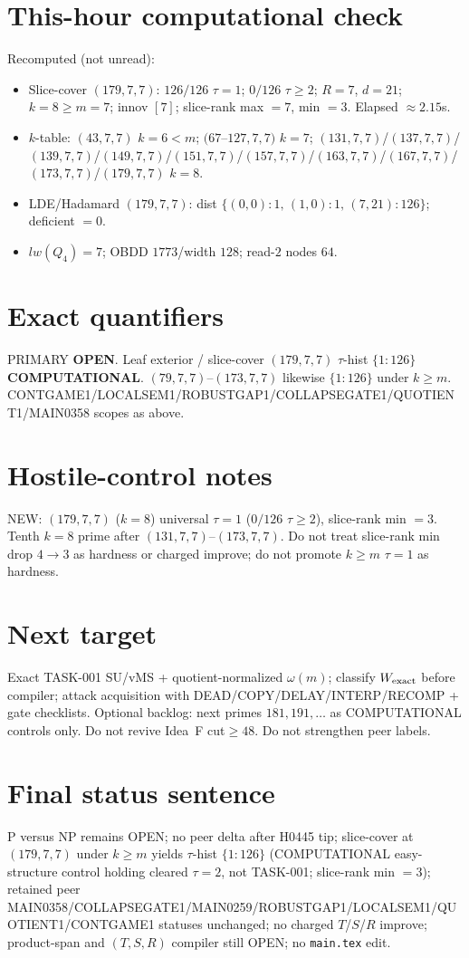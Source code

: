 \documentclass[11pt]{article}
\begin{document}
\section*{This-hour computational check}
Recomputed (not unread):
\begin{itemize}
\item Slice-cover $(179,7,7)$: $126/126$ $\tau{=}1$; $0/126$ $\tau{\ge}2$; $R{=}7$, $d{=}21$;
  $k{=}8{\ge}m{=}7$; innov $[7]$; slice-rank max $=7$, min $=3$. Elapsed $\approx2.15$s.
\item $k$-table: $(43,7,7)$ $k{=}6{<}m$; $(67$--$127,7,7)$ $k{=}7$;
  $(131,7,7)$/$(137,7,7)$/$(139,7,7)$/$(149,7,7)$/$(151,7,7)$/$(157,7,7)$/$(163,7,7)$/$(167,7,7)$/$(173,7,7)$/$(179,7,7)$ $k{=}8$.
\item LDE/Hadamard $(179,7,7)$: dist $\{(0,0){:}1,\,(1,0){:}1,\,(7,21){:}126\}$; deficient $=0$.
\item $lw(Q_4)=7$; OBDD $1773$/width $128$; read-$2$ nodes $64$.
\end{itemize}

\section*{Exact quantifiers}
PRIMARY \textbf{OPEN}. Leaf exterior / slice-cover $(179,7,7)$ $\tau$-hist $\{1{:}126\}$ \textbf{COMPUTATIONAL}.
$(79,7,7)$--$(173,7,7)$ likewise $\{1{:}126\}$ under $k{\ge}m$. CONTGAME1/LOCALSEM1/ROBUSTGAP1/COLLAPSEGATE1/QUOTIENT1/MAIN0358 scopes as above.

\section*{Hostile-control notes}
NEW: $(179,7,7)$ ($k{=}8$) universal $\tau{=}1$ ($0/126$ $\tau{\ge}2$), slice-rank min $=3$.
Tenth $k{=}8$ prime after $(131,7,7)$--$(173,7,7)$.
Do not treat slice-rank min drop $4\to3$ as hardness or charged improve;
do not promote $k{\ge}m$ $\tau{=}1$ as hardness.

\section*{Next target}
Exact TASK-001 SU/vMS + quotient-normalized $\omega(m)$; classify $W_{\rm exact}$ before compiler;
attack acquisition with DEAD/COPY/DELAY/INTERP/RECOMP + gate checklists.
Optional backlog: next primes $181,191,\ldots$ as COMPUTATIONAL controls only.
Do not revive Idea~F cut$\ge48$. Do not strengthen peer labels.

\section*{Final status sentence}
P versus NP remains OPEN; no peer delta after H0445 tip; slice-cover at $(179,7,7)$ under $k{\ge}m$ yields $\tau$-hist $\{1{:}126\}$ (COMPUTATIONAL easy-structure control holding cleared $\tau{=}2$, not TASK-001; slice-rank min $=3$); retained peer MAIN0358/COLLAPSEGATE1/MAIN0259/ROBUSTGAP1/LOCALSEM1/QUOTIENT1/CONTGAME1 statuses unchanged; no charged $T$/$S$/$R$ improve; product-span and $(T,S,R)$ compiler still OPEN; no \texttt{main.tex} edit.
\end{document}
